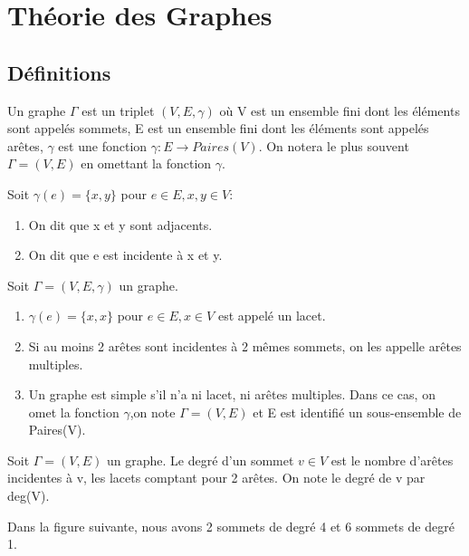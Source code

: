 

\section{Théorie des Graphes}

\subsection{Définitions}

\begin{defn}
Un graphe $\Gamma$ est un triplet $(V,E,\gamma)$ où V est un ensemble fini dont les éléments sont appelés sommets, E est un ensemble fini dont les éléments sont appelés arêtes, $\gamma$ est une fonction $\gamma : E \rightarrow Paires(V)$. On notera le plus souvent $\Gamma = (V,E)$ en omettant la fonction $\gamma$.

Soit $\gamma(e) = \{x,y\}$ pour $e \in E, x,y \in V$:
\begin{enumerate}
	\item On dit que x et y sont adjacents.

	\item On dit que e est incidente à x et y. 
\end{enumerate}

\end{defn}

\begin{defn}
Soit $\Gamma = (V,E,\gamma)$ un graphe.

\begin{enumerate}
	\item $\gamma(e)= \{x,x\}$ pour $e \in E, x \in V$ est appelé un lacet.
	\item Si au moins 2 arêtes sont incidentes à 2 mêmes sommets, on les appelle arêtes multiples.
	\item Un graphe est simple s'il n'a ni lacet, ni arêtes multiples. Dans ce cas, on omet la fonction $\gamma$,on note $\Gamma = (V,E)$ et E est identifié un sous-ensemble de Paires(V). 
\end{enumerate}
\end{defn}

\begin{defn}
Soit $\Gamma = (V,E)$ un graphe. Le degré d'un sommet $v \in V$ est le nombre d'arêtes incidentes à v, les lacets comptant pour 2 arêtes. On note le degré de v par deg(V).
\end{defn}

\begin{exmp}
Dans la figure suivante, nous avons 2 sommets de degré 4 et 6 sommets de degré 1.
\end{exmp}

